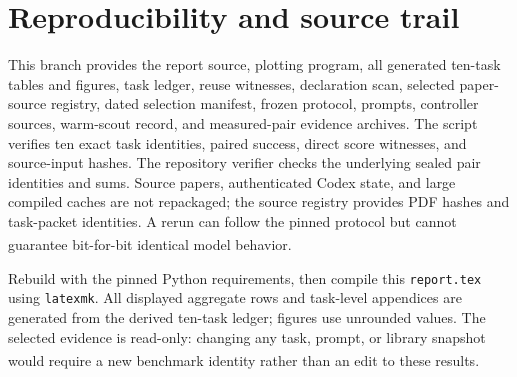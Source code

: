 \documentclass[10pt,a4paper]{article}
\newcommand{\src}[1]{\textsuperscript{\cite{#1}}}
\begin{document}
\section{Reproducibility and source trail}

This branch provides the report source, plotting program, all generated
ten-task tables and figures, task ledger, reuse witnesses, declaration scan,
selected paper-source registry, dated selection manifest, frozen protocol,
prompts, controller sources, warm-scout record, and measured-pair evidence
archives. The script verifies ten exact task identities, paired success,
direct score witnesses, and source-input hashes. The repository verifier
checks the underlying sealed pair identities and sums. Source papers,
authenticated Codex state, and large compiled caches are not repackaged;
the source registry provides PDF hashes and task-packet identities. A rerun
can follow the pinned protocol but cannot guarantee bit-for-bit identical
model behavior.\src{readme,summary,registry,evidence}

Rebuild with the pinned Python requirements, then compile this
\texttt{report.tex} using \texttt{latexmk}. All displayed aggregate rows
and task-level appendices are generated from the derived ten-task ledger;
figures use unrounded values. The selected evidence is read-only: changing
any task, prompt, or library snapshot would require a new benchmark identity
rather than an edit to these results.\src{plotcode,readme,taskledger}
\end{document}
